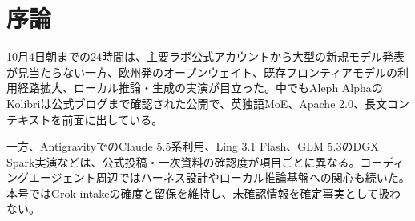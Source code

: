\section*{序論}
10月4日朝までの24時間は、主要ラボ公式アカウントから大型の新規モデル発表が見当たらない一方、欧州発のオープンウェイト、既存フロンティアモデルの利用経路拡大、ローカル推論・生成の実演が目立った。中でもAleph AlphaのKolibriは公式ブログまで確認された公開で、英独語MoE、Apache 2.0、長文コンテキストを前面に出している。

一方、AntigravityでのClaude 5.5系利用、Ling 3.1 Flash、GLM 5.3のDGX Spark実演などは、公式投稿・一次資料の確認度が項目ごとに異なる。コーディングエージェント周辺ではハーネス設計やローカル推論基盤への関心も続いた。本号ではGrok intakeの確度と留保を維持し、未確認情報を確定事実として扱わない。
